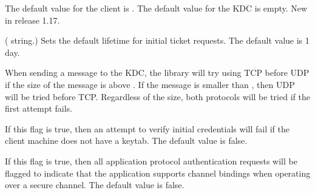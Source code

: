 \documentclass[letterpaper,10pt,english]{sphinxmanual}
\begin{document}
\begin{description}
\sphinxAtStartPar
The default value for the client is .  The default
value for the KDC is empty.  New in release 1.17.

\sphinxAtStartPar
( string.)  Sets the default lifetime for initial
ticket requests.  The default value is 1 day.

\sphinxAtStartPar
When sending a message to the KDC, the library will try using TCP
before UDP if the size of the message is above
.  If the message is smaller than
, then UDP will be tried before TCP.
Regardless of the size, both protocols will be tried if the first
attempt fails.

\sphinxAtStartPar
If this flag is true, then an attempt to verify initial
credentials will fail if the client machine does not have a
keytab.  The default value is false.

\sphinxAtStartPar
If this flag is true, then all application protocol authentication
requests will be flagged to indicate that the application supports
channel bindings when operating over a secure channel.  The
default value is false.

\end{description}
\end{document}
